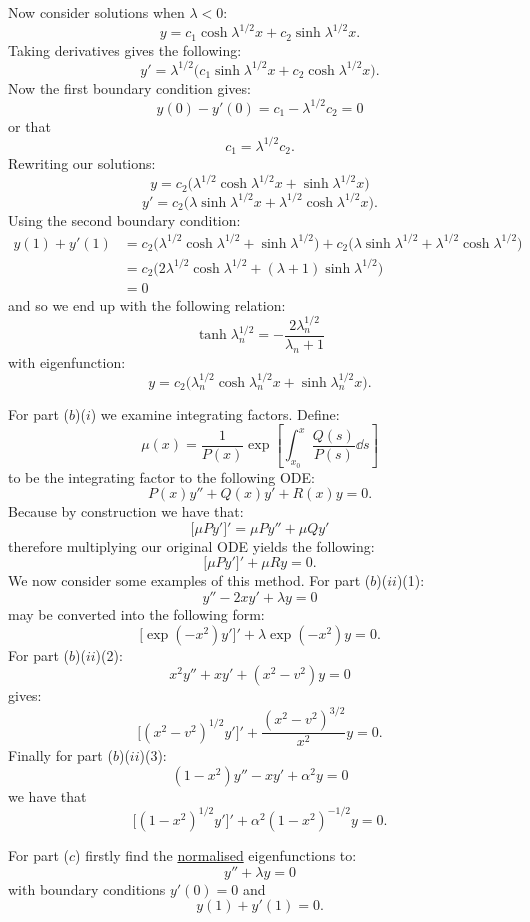 \begin{enumerate}
    Now consider solutions when $\lambda<0$:
    $$y=c_1\cosh\lambda^{1/2}x+c_2\sinh\lambda^{1/2}x.$$
    Taking derivatives gives the following:
    $$y'=\lambda^{1/2}\bigl(c_1\sinh\lambda^{1/2}x+c_2\cosh\lambda^{1/2}x\bigr).$$
    Now the first boundary condition gives:
    $$y(0)-y'(0)=c_1-\lambda^{1/2}c_2=0$$
    or that
    $$c_1=\lambda^{1/2}c_2.$$
    Rewriting our solutions:
    $$y=c_2\bigl(\lambda^{1/2}\cosh\lambda^{1/2}x+\sinh\lambda^{1/2}x\bigr)$$
    $$y'=c_2\bigl(\lambda\sinh\lambda^{1/2}x+\lambda^{1/2}\cosh\lambda^{1/2}x\bigr).$$
    Using the second boundary condition:
    \begin{align*}
        y(1)+y'(1)
        &=c_2\bigl(\lambda^{1/2}\cosh\lambda^{1/2}+\sinh\lambda^{1/2}\bigr)
        +c_2\bigl(\lambda\sinh\lambda^{1/2}+\lambda^{1/2}\cosh\lambda^{1/2}\bigr) \\
        &=c_2\bigl(2\lambda^{1/2}\cosh\lambda^{1/2}
        +(\lambda+1)\sinh\lambda^{1/2}\bigr) \\
        &=0
    \end{align*}
    and so we end up with the following relation:
    $$\tanh\lambda_n^{1/2}=-\frac{2\lambda_n^{1/2}}{\lambda_n+1}$$
    with eigenfunction:
    $$y=c_2\bigl(\lambda_n^{1/2}\cosh\lambda_n^{1/2}x+\sinh\lambda_n^{1/2}x\bigr).$$

    \newpage

    For part ($b$)($i$) we examine integrating factors. Define:
    $$\mu(x)=\frac{1}{P(x)}\exp\left[\int_{x_0}^{x}\frac{Q(s)}{P(s)}\dd s\right]$$
    to be the integrating factor to the following ODE:
    $$P(x)y''+Q(x)y'+R(x)y=0.$$
    Because by construction we have that:
    $$\bigl[\mu Py'\bigr]'=\mu Py''+\mu Qy'$$
    therefore multiplying our original ODE yields the following:
    $$\bigl[\mu Py'\bigr]'+\mu Ry=0.$$
    We now consider some examples of this method. For part ($b$)($ii$)(1):
    $$y''-2xy'+\lambda y=0$$
    may be converted into the following form:
    $$\bigl[\exp(-x^2)y'\bigr]'+\lambda\exp(-x^2)y=0.$$
    For part ($b$)($ii$)(2):
    $$x^2 y''+xy'+(x^2-v^2)y=0$$
    gives:
    $$\bigl[(x^2-v^2)^{1/2}y'\bigr]'+\frac{(x^2-v^2)^{3/2}}{x^2}y=0.$$
    Finally for part ($b$)($ii$)(3):
    $$(1-x^2)y''-xy'+\alpha^2 y=0$$
    we have that
    $$\bigl[(1-x^2)^{1/2}y'\bigr]'+\alpha^2(1-x^2)^{-1/2}y=0.$$

    \newpage

    For part ($c$) firstly find the \underline{normalised}
    eigenfunctions to:
    $$y''+\lambda y=0$$
    with boundary conditions $y'(0)=0$ and
    $$y(1)+y'(1)=0.$$ \\


\end{enumerate}
